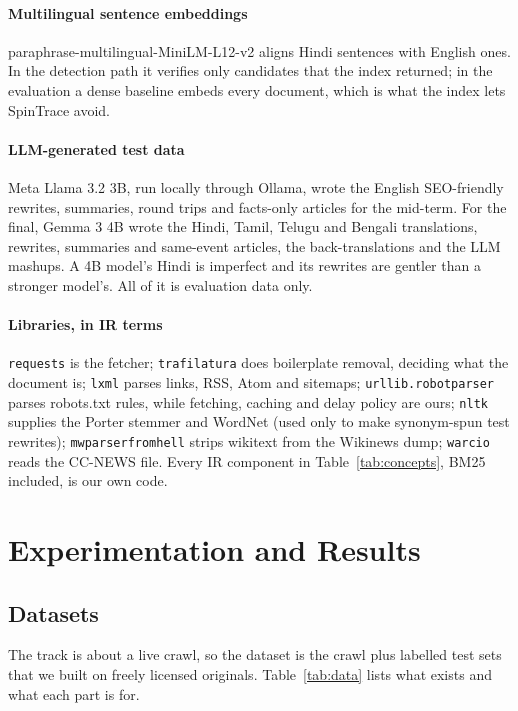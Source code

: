 \documentclass[11pt,a4paper]{article}
\newcommand{\code}[1]{\texttt{#1}}
\begin{document}
\paragraph{Multilingual sentence embeddings} paraphrase-multilingual-MiniLM-L12-v2 aligns Hindi sentences with English ones. In the detection path it verifies only candidates that the index returned; in the evaluation a dense baseline embeds every document, which is what the index lets SpinTrace avoid.

\paragraph{LLM-generated test data} Meta Llama 3.2 3B, run locally through Ollama, wrote the English SEO-friendly rewrites, summaries, round trips and facts-only articles for the mid-term. For the final, Gemma 3 4B wrote the Hindi, Tamil, Telugu and Bengali translations, rewrites, summaries and same-event articles, the back-translations and the LLM mashups. A 4B model's Hindi is imperfect and its rewrites are gentler than a stronger model's. All of it is evaluation data only.

\paragraph{Libraries, in IR terms} \code{requests} is the fetcher; \code{trafilatura} does boilerplate removal, deciding what the document is; \code{lxml} parses links, RSS, Atom and sitemaps; \code{urllib.robotparser} parses robots.txt rules, while fetching, caching and delay policy are ours; \code{nltk} supplies the Porter stemmer and WordNet (used only to make synonym-spun test rewrites); \code{mwparserfromhell} strips wikitext from the Wikinews dump; \code{warcio} reads the CC-NEWS file. Every IR component in Table~\ref{tab:concepts}, BM25 included, is our own code.

\section{Experimentation and Results}
\label{sec:eval}

\subsection{Datasets}
\label{sec:data}

The track is about a live crawl, so the dataset is the crawl plus labelled test sets that we built on freely licensed originals. Table~\ref{tab:data} lists what exists and what each part is for.
\end{document}
